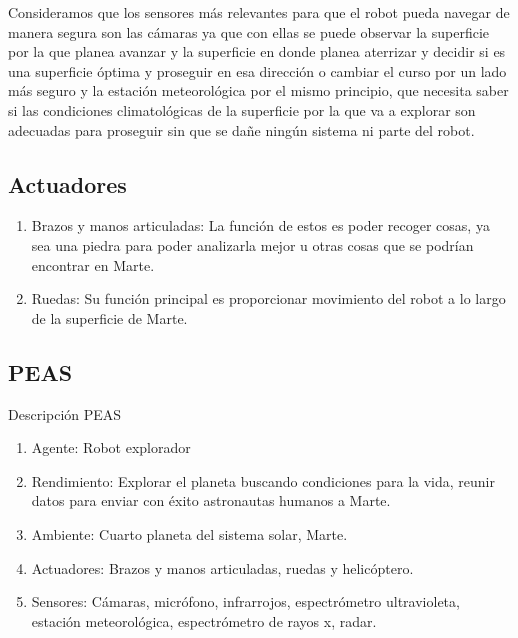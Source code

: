 \documentclass{article}
\begin{document}
        Consideramos que los sensores más relevantes para que el robot pueda navegar de manera segura son las cámaras ya que con ellas se puede observar la superficie por la que planea avanzar y la superficie en donde planea aterrizar y decidir si es una superficie óptima y proseguir en esa dirección o cambiar el curso por un lado más seguro y la estación meteorológica por el mismo principio, que necesita saber si las condiciones climatológicas de la superficie por la que va a explorar son adecuadas para proseguir sin que se dañe ningún sistema ni parte del robot.

        \subsection{Actuadores}
            \begin{enumerate}
                \item Brazos y manos articuladas: La función de estos es poder recoger cosas, ya sea una piedra para poder analizarla mejor u otras cosas que se podrían encontrar en Marte. 
                \item Ruedas: Su función principal es proporcionar movimiento del robot a lo largo de la superficie de Marte.
            \end{enumerate}

        \subsection{PEAS}
            Descripción PEAS
            \begin{enumerate}
                \item Agente: Robot explorador
                \item Rendimiento: Explorar el planeta buscando condiciones para la vida, reunir datos para enviar con éxito astronautas humanos a Marte.
                \item Ambiente: Cuarto planeta del sistema solar, Marte.
                \item Actuadores: Brazos y manos articuladas, ruedas y helicóptero.
                \item Sensores: Cámaras, micrófono, infrarrojos, espectrómetro ultravioleta, estación meteorológica, espectrómetro de rayos x, radar. 
            \end{enumerate}
            
\end{document}
